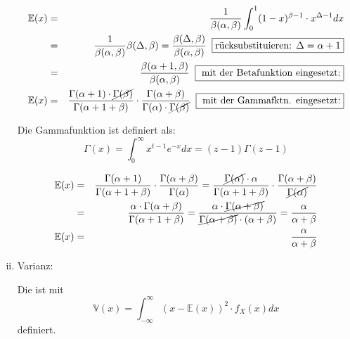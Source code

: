 \begin{uebsp}
\begin{Answer}
\begin{enumerate}[i)]
            \begin{eqnarray*}
                \mathbb{E}(x) &=& \frac{1}{\beta(\alpha, \beta)} \int_0^1 (1-x)^{\beta-1} \cdot x^{\Delta-1}dx\\
                 &=& \frac{1}{\beta(\alpha, \beta)} \beta(\Delta, \beta) = \frac{\beta(\Delta, \beta)}{\beta(\alpha, \beta)}\;\;\fbox{rücksubstituieren: $\Delta=\alpha+1$}\\
                 &=& \frac{\beta(\alpha+1, \beta)}{\beta(\alpha, \beta)}\;\;\fbox{ mit der Betafunktion eingesetzt:}\\
                \mathbb{E}(x) &=& \frac{\Gamma(\alpha+1)\cdot\cancel{\Gamma(\beta)}}{\Gamma(\alpha+1+\beta)} \cdot \frac{\Gamma(\alpha+\beta)}{\Gamma(\alpha)\cdot\cancel{\Gamma(\beta)}}\;\;\fbox{ mit der Gammafktn. eingesetzt:}
            \end{eqnarray*}

            \begin{uebsp_theory}
                Die Gammafunktion ist definiert als:
                \[\Gamma(x)=\int_0^\infty x^{t-1}e^{-x}dx=(z-1)\Gamma(z-1)\]
            \end{uebsp_theory}
            \begin{eqnarray*}
                \mathbb{E}(x) &=& \frac{\Gamma(\alpha+1)}{\Gamma(\alpha+1+\beta)} \cdot \frac{\Gamma(\alpha+\beta)}{\Gamma(\alpha)} = \frac{\cancel{\Gamma(\alpha)}\cdot\alpha}{\Gamma(\alpha+1+\beta)} \cdot \frac{\Gamma(\alpha+\beta)}{\cancel{\Gamma(\alpha)}}\\
                 &=& \frac{\alpha\cdot \Gamma(\alpha+\beta)}{\Gamma(\alpha+1+\beta)} =  \frac{\alpha\cdot \cancel{\Gamma(\alpha+\beta)}}{\cancel{\Gamma(\alpha+\beta)}\cdot(\alpha+\beta)} = \frac{\alpha}{\alpha+\beta}\\
                \mathbb{E}(x) &=& \frac{\alpha}{\alpha+\beta}
            \end{eqnarray*}

        \item Varianz:
            \begin{uebsp_theory}
            Die  ist mit 
                \[\mathbb{V}(x)=\int_{-\infty}^\infty (x-\mathbb{E}(x))^2\cdot f_X(x)dx\]
            definiert.
            \end{uebsp_theory}


\end{enumerate}
\end{Answer}
\end{uebsp}

